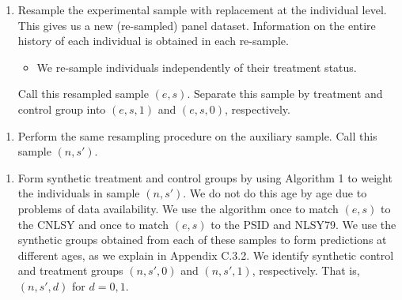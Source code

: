 \documentclass[static]{JJH-Beamer}
\begin{document}
\begin{frame}
 \addtocounter{framenumber}{-1}

\begin{enumerate}[1.]
\item Resample the experimental sample with replacement at the individual level. This gives us a new (re-sampled) panel dataset. Information on the entire history of each individual is obtained in each re-sample.
\begin{itemize}
\item We re-sample individuals independently of their treatment status.
\end{itemize}
Call this resampled sample $(e,s)$. Separate this sample by treatment and control group into $(e,s,1)$ and $(e,s,0)$, respectively.
\end{enumerate}

\end{frame}

\begin{frame}
 \addtocounter{framenumber}{-1}

\begin{enumerate}[2.]
\item Perform the same resampling procedure on the auxiliary sample. Call this sample $(n,s')$.
\end{enumerate}

\end{frame}

\begin{frame}
 \addtocounter{framenumber}{-1}

\begin{enumerate}[3.]
\item Form synthetic treatment and control groups by using Algorithm 1 to weight the individuals in sample $(n,s')$. We do not do this age by age due to problems of data availability. We use the algorithm once to match $(e,s)$ to the CNLSY and once to match $(e,s)$ to the PSID and NLSY79. We use the synthetic groups obtained from each of these samples to form predictions at different ages, as we explain in Appendix C.3.2. We identify synthetic control and treatment groups $(n,s',0)$ and $(n,s',1)$, respectively. That is, $(n,s',d)$ for $d = {0,1}$.
\end{enumerate}

\end{frame}
\end{document}
